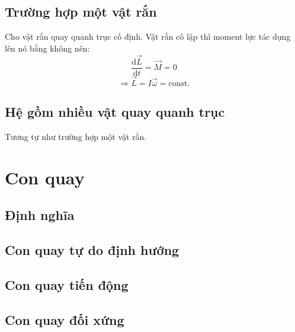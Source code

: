 \subsection{Trường hợp một vật rắn}
Cho vật rắn quay quanh trục cố định. Vật rắn cô lập thì moment lực tác dụng lên nó bằng không nên:
$$\frac{\mathrm{d}\overrightarrow{L}}{\mathrm{d}t} = \overrightarrow{M} = 0$$
$$\Rightarrow \overrightarrow{L} = I \overrightarrow{\omega} = \mathrm{const}.$$
\subsection{Hệ gồm nhiều vật quay quanh trục}
Tương tự như trường hợp một vật rắn.
\section{Con quay}
\subsection{Định nghĩa}
\subsection{Con quay tự do định hướng}
\subsection{Con quay tiến động}
\subsection{Con quay đối xứng}